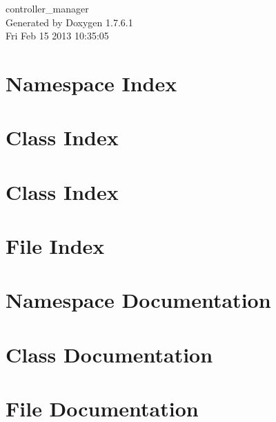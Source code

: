\documentclass[a4paper]{book}
\begin{document}
\begin{titlepage}
\vspace*{7cm}
\begin{center}
{\Large controller\-\_\-manager }\\
\vspace*{1cm}
{\large \-Generated by Doxygen 1.7.6.1}\\
\vspace*{0.5cm}
{\small Fri Feb 15 2013 10:35:05}\\
\end{center}
\end{titlepage}
\clearemptydoublepage
{}
\tableofcontents
\clearemptydoublepage
{}
\chapter{\-Namespace \-Index}

\chapter{\-Class \-Index}

\chapter{\-Class \-Index}

\chapter{\-File \-Index}

\chapter{\-Namespace \-Documentation}



\chapter{\-Class \-Documentation}




\chapter{\-File \-Documentation}







\printindex
\end{document}
